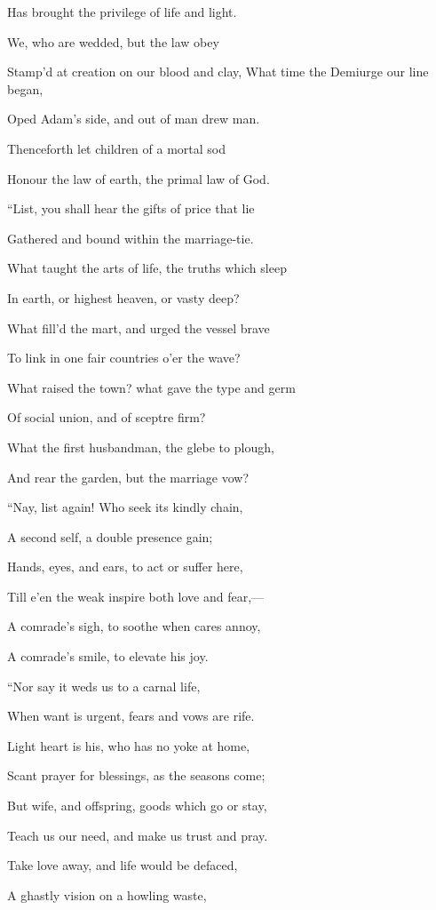 Has brought the privilege of life and light.

We, who are wedded, but the law obey

Stamp'd at creation on our blood and clay, What time the Demiurge our line began,

Oped Adam's side, and out of man drew man.

Thenceforth let children of a mortal sod

Honour the law of earth, the primal law of God.

``List, you shall hear the gifts of price
that lie

Gathered and bound within the marriage-tie.

What taught the arts of life, the truths which sleep

In earth, or highest heaven, or vasty deep?

What fill'd the mart, and urged the vessel brave

To link in one fair countries o'er the wave?

What raised the town? what gave the type and germ

Of social union, and of sceptre firm?

What the first husbandman, the glebe to plough,

And rear the garden, but the marriage vow?

``Nay, list again! Who seek its kindly
chain,

A second self, a double presence gain;

Hands, eyes, and ears, to act or suffer here,

Till e'en the weak inspire both love and fear,—

A comrade's sigh, to soothe when cares annoy,

A comrade's smile, to elevate his joy.

``Nor say it weds us to a carnal life,

When want is urgent, fears and vows are rife.

Light heart is his, who has no yoke at home,

Scant prayer for blessings, as the seasons
come;

But wife, and offspring, goods which go or
stay,

Teach us our need, and make us trust and
pray.

Take love away, and life would be defaced,

A ghastly vision on a howling waste,

